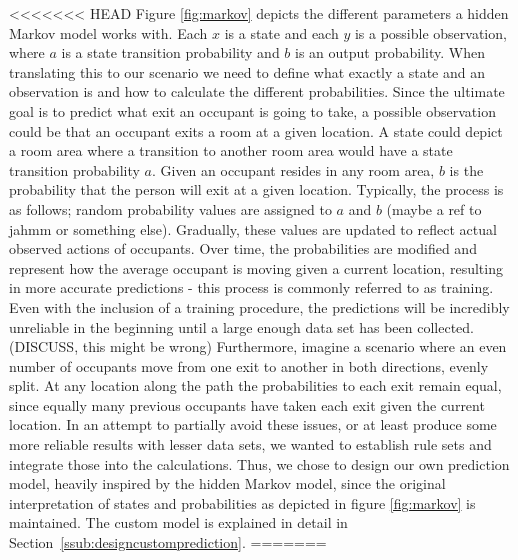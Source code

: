 <<<<<<< HEAD
Figure \ref{fig:markov} depicts the different parameters a hidden Markov model works with. Each \(x\) is a state and each \(y\) is a possible observation, where \(a\) is a state transition probability and \(b\) is an output probability. When translating this to our scenario we need to define what exactly a state and an observation is and how to calculate the different probabilities. Since the ultimate goal is to predict what exit an occupant is going to take, a possible observation could be that an occupant exits a room at a given location. A state could depict a room area where a transition to another room area would have a state transition probability \(a\). Given an occupant resides in any room area, \(b\) is the probability that the person will exit at a given location. Typically, the process is as follows; random probability values are assigned to \(a\) and \(b\) (maybe a ref to jahmm or something else). Gradually, these values are updated to reflect actual observed actions of occupants. Over time, the probabilities are modified and represent how the average occupant is moving given a current location, resulting in more accurate predictions - this process is commonly referred to as training. Even with the inclusion of a training procedure, the predictions will be incredibly unreliable in the beginning until a large enough data set has been collected. (DISCUSS, this might be wrong) Furthermore, imagine a scenario where an even number of occupants move from one exit to another in both directions, evenly split. At any location along the path the probabilities to each exit remain equal, since equally many previous occupants have taken each exit given the current location. In an attempt to partially avoid these issues, or at least produce some more reliable results with lesser data sets, we wanted to establish rule sets and integrate those into the calculations. Thus, we chose to design our own prediction model, heavily inspired by the hidden Markov model, since the original interpretation of states and probabilities as depicted in figure \ref{fig:markov} is maintained. The custom model is explained in detail in Section~\ref{ssub:designcustomprediction}. 
=======

